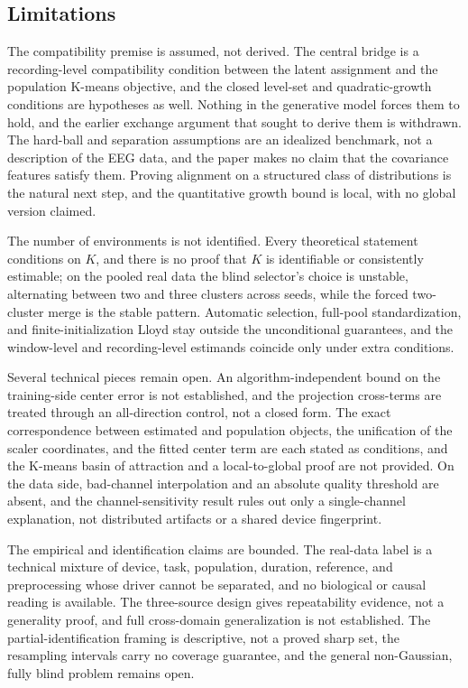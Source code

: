 \subsection{Limitations}\label{limitations}

The compatibility premise is assumed, not derived. The central bridge is
a recording-level compatibility condition between the latent assignment
and the population K-means objective, and the closed level-set and
quadratic-growth conditions are hypotheses as well. Nothing in the
generative model forces them to hold, and the earlier exchange argument
that sought to derive them is withdrawn. The hard-ball and separation
assumptions are an idealized benchmark, not a description of the EEG
data, and the paper makes no claim that the covariance features satisfy
them. Proving alignment on a structured class of distributions is the
natural next step, and the quantitative growth bound is local, with no
global version claimed.

The number of environments is not identified. Every theoretical
statement conditions on \(K\), and there is no proof that \(K\) is
identifiable or consistently estimable; on the pooled real data the
blind selector's choice is unstable, alternating between two and three
clusters across seeds, while the forced two-cluster merge is the stable
pattern. Automatic selection, full-pool standardization, and
finite-initialization Lloyd stay outside the unconditional guarantees,
and the window-level and recording-level estimands coincide only under
extra conditions.

Several technical pieces remain open. An algorithm-independent bound on
the training-side center error is not established, and the projection
cross-terms are treated through an all-direction control, not a closed
form. The exact correspondence between estimated and population objects,
the unification of the scaler coordinates, and the fitted center term
are each stated as conditions, and the K-means basin of attraction and a
local-to-global proof are not provided. On the data side, bad-channel
interpolation and an absolute quality threshold are absent, and the
channel-sensitivity result rules out only a single-channel explanation,
not distributed artifacts or a shared device fingerprint.

The empirical and identification claims are bounded. The real-data label
is a technical mixture of device, task, population, duration, reference,
and preprocessing whose driver cannot be separated, and no biological or
causal reading is available. The three-source design gives repeatability
evidence, not a generality proof, and full cross-domain generalization
is not established. The partial-identification framing is descriptive,
not a proved sharp set, the resampling intervals carry no coverage
guarantee, and the general non-Gaussian, fully blind problem remains
open.

